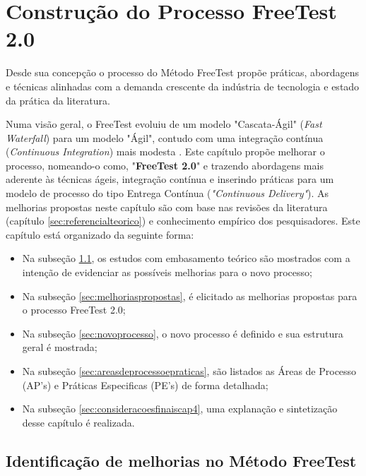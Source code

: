 \chapter{Construção do Processo FreeTest 2.0}
\label{sec:construcaoframeworkprocesso}

Desde sua concepção o processo do Método FreeTest propõe práticas, abordagens e técnicas alinhadas com a demanda crescente da indústria de tecnologia e estado da prática da literatura. 

Numa visão geral, o FreeTest evoluiu de um modelo "Cascata-Ágil" (\textit{Fast Waterfall}) para um modelo "Ágil", contudo com uma integração contínua (\textit{Continuous Integration}) mais modesta \cite{sauceLabes2017}. Este capítulo propõe melhorar o processo, nomeando-o como, "\textbf{FreeTest 2.0}" e trazendo abordagens mais aderente às técnicas ágeis, integração contínua e inserindo práticas para um modelo de processo do tipo Entrega Contínua (\textit{"Continuous Delivery"}). As melhorias propostas neste capítulo são com base nas revisões da literatura (capítulo \ref{sec:referencialteorico}) e conhecimento empírico dos pesquisadores. Este capítulo está organizado da seguinte forma:

\begin{itemize}
    \item Na subseção \ref{sec:identificacaomelhoriasfreetest}, os estudos com embasamento teórico são mostrados com a intenção de evidenciar as possíveis melhorias para o novo processo;
    \item Na subseção \ref{sec:melhoriaspropostas}, é elicitado as melhorias propostas para o processo FreeTest 2.0;
    \item Na subseção \ref{sec:novoprocesso}, o novo processo é definido e sua estrutura geral é mostrada;
    \item Na subseção \ref{sec:areasdeprocessoepraticas}, são listados as Áreas de Processo (AP's) e Práticas Especificas (PE's) de forma detalhada;
    \item Na subseção \ref{sec:consideracoesfinaiscap4}, uma explanação e sintetização desse capítulo é realizada.
\end{itemize}

\section{Identificação de melhorias no Método FreeTest}
\label{sec:identificacaomelhoriasfreetest}

